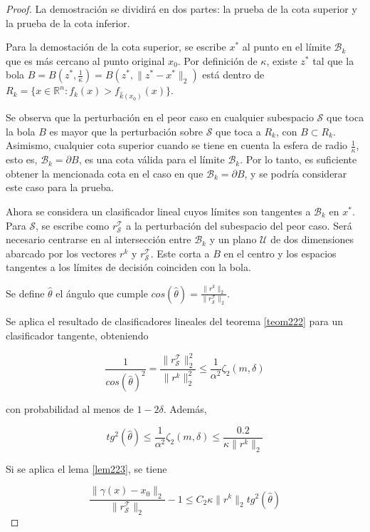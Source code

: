 \begin{proof}
La demostración se dividirá en dos partes: la prueba de la cota superior y la prueba de la cota inferior.

Para la demostación de la cota superior, se escribe $x^*$ al punto en el límite $\mathcal{B}_k$ que es más cercano al punto original $x_0$. Por definición de $\kappa$, existe $z^*$ tal que la bola $B=B(z^*,\frac{1}{\kappa})=B(z^*,\|z^*-x^*\|_2)$ está dentro de $R_k=\{x \in \mathbb{R}^n : f_k(x) > f_{\widehat{k}(x_0)}(x)\}$.

Se observa que la perturbación en el peor caso en cualquier subespacio $\mathcal{S}$ que toca la bola $B$ es mayor que la perturbación sobre $\mathcal{S}$ que toca a $R_k$, con $B \subset R_k$. Asimismo, cualquier cota superior cuando se tiene en cuenta la esfera de radio $\frac{1}{\kappa}$, esto es, $\mathcal{B}_k = \partial B$, es una cota válida para el límite $\mathcal{B}_k$. Por lo tanto, es suficiente obtener la mencionada cota en el caso en que $\mathcal{B}_k = \partial B$, y se podría considerar este caso para la prueba.

Ahora se considera un clasificador lineal cuyos límites son tangentes a $\mathcal{B}_k$ en $x^*$. Para $\mathcal{S}$, se escribe como $r_\mathcal{S}^\mathcal{T}$ a la perturbación del subespacio del peor caso. Será necesario centrarse en al intersección entre $\mathcal{B}_k$ y un plano $\mathcal{U}$ de dos dimensiones abarcado por los vectores $r^k$ y $r_\mathcal{S}^\mathcal{T}$. Este corta a $B$ en el centro y los espacios tangentes a los límites de decisión coinciden con la bola.

Se define $\widehat{\theta}$ el ángulo que cumple $cos(\widehat{\theta})=\frac{\|r^k \|_2}{\|r_\mathcal{S}^\mathcal{T} \|_2}$.

Se aplica el resultado de clasificadores lineales del teorema \ref{teom222} para un clasificador tangente, obteniendo

$$\frac{1}{cos(\widehat{\theta})^2} = \frac{\|r_\mathcal{S}^\mathcal{T} \|_2^2}{\|r^k \|_2^2} \leq \frac{1}{\alpha^2} \zeta_2 (m,\delta)$$

con probabilidad al menos de $1-2\delta$. Además,

$$tg^2(\widehat{\theta}) \leq \frac{1}{\alpha^2} \zeta_2(m,\delta) \leq \frac{0.2}{\kappa \|r^k \|_2}$$

Si se aplica el lema \ref{lem223}, se tiene

$$\frac{\| \gamma(x)-x_0\|_2}{\|r_\mathcal{S}^\mathcal{T} \|_2} - 1 \leq C_2 \kappa \|r^k \|_2 tg^2(\widehat{\theta})$$


\end{proof}
